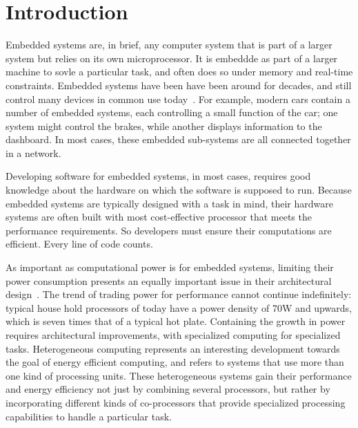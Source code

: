

%
%

\chapter{Introduction}

Embedded systems are, in brief, any computer system that is part of a larger system but relies on its own microprocessor. It is embeddde as part of a larger machine to sovle a particular task, and often does so under memory and real-time constraints. Embedded systems have been have been around for decades, and still control many devices in common use today~\cite{barr2006}. For example, modern cars contain a number of embedded systems, each controlling a small function of the car; one system might control the brakes, while another displays information to the dashboard. In most cases, these embedded sub-systems are all connected together in a network. 

Developing software for embedded systems, in most cases, requires good knowledge about the hardware on which the software is supposed to run. Because embedded systems are typically designed with a task in mind, their hardware systems are often built with most cost-effective processor that meets the performance requirements. So developers must ensure their computations are efficient. Every line of code counts.

As important as computational power is for embedded systems, limiting their power consumption presents an equally important issue in their architectural design~\cite{mudge2001}. The trend of trading power for performance cannot continue indefinitely: typical house hold processors of today have a power density of 70W and upwards, which is seven times that of a typical hot plate. Containing the growth in power requires architectural improvements, with specialized computing for specialized tasks. Heterogeneous computing represents an interesting development towards the goal of energy efficient computing, and refers to systems that use more than one kind of processing units. These heterogeneous systems gain their performance and energy efficiency not just by combining several processors, but rather by incorporating different kinds of co-processors that provide specialized processing capabilities to handle a particular task.

